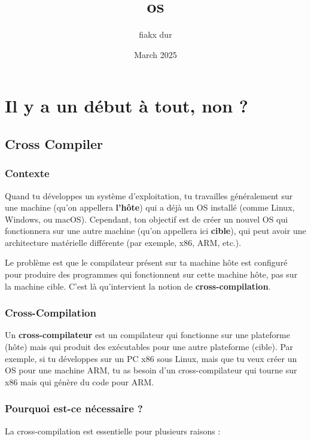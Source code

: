 \documentclass{article}
\title{os}
\author{fiakx dur}
\date{March 2025}
\begin{document}
\maketitle

\section{Il y a un début à tout, non ?}

\subsection{Cross Compiler}

\subsubsection{Contexte}
Quand tu développes un système d'exploitation, tu travailles généralement sur une machine (qu'on appellera \textbf{l'hôte}) qui a déjà un OS installé (comme Linux, Windows, ou macOS). Cependant, ton objectif est de créer un nouvel OS qui fonctionnera sur une autre machine (qu'on appellera ici \textbf{cible}), qui peut avoir une architecture matérielle différente (par exemple, x86, ARM, etc.).

Le problème est que le compilateur présent sur ta machine hôte est configuré pour produire des programmes qui fonctionnent sur cette machine hôte, pas sur la machine cible. C'est là qu'intervient la notion de \textbf{cross-compilation}.

\subsubsection{Cross-Compilation}
Un \textbf{cross-compilateur} est un compilateur qui fonctionne sur une plateforme (hôte) mais qui produit des exécutables pour une autre plateforme (cible). Par exemple, si tu développes sur un PC x86 sous Linux, mais que tu veux créer un OS pour une machine ARM, tu as besoin d'un cross-compilateur qui tourne sur x86 mais qui génère du code pour ARM.

\subsubsection{Pourquoi est-ce nécessaire ?}
La cross-compilation est essentielle pour plusieurs raisons :
\end{document}
